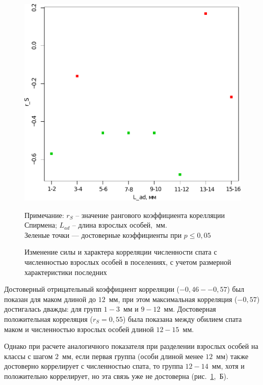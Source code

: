 \begin{figure}[h]
\begin{minipage}[b]{.46\linewidth}
	\begin{center}
		\includegraphics[width=\textwidth]{../White_Sea/spat/spearman_spat_2mm_1.pdf}
	\end{center}
	\end{minipage}
	\caption{Изменение силы и характера корреляции численности спата с численностью взрослых особей в поселениях, с учетом размерной характеристики последних}
	\label{ris:spearman_size}
	
	\footnotesize{Примечание: $r_S$ – значение рангового коэффициента корелляции Спирмена;
 $L_{ad}$ – длина взрослых особей,~мм. \\
Зеленые точки --- достоверные коэффициенты при $p \le 0,05$}
	\end{figure}
Достоверный отрицательный коэффициент корреляции ($-0,46 - -0,57$) был показан для маком длиной до $12$~мм, при этом максимальная корреляция ($-0,57$) достигалась дважды: для групп $1-3$~мм и $9-12$~мм. 
Достоверная положительная корреляция ($r_S=0,55$) была показана между обилием спата маком и численностью взрослых особей длиной $12-15$~мм.

Однако при расчете аналогичного показателя при разделении взрослых особей на классы с шагом $2$~мм, если первая группа (особи длиной менее $12$~мм) также достоверно коррелирует с численностью спата, то группа $12-14$~мм, хотя и положительно коррелирует, но эта связь уже не достоверна (рис.~\ref{ris:spearman_size},~Б).

